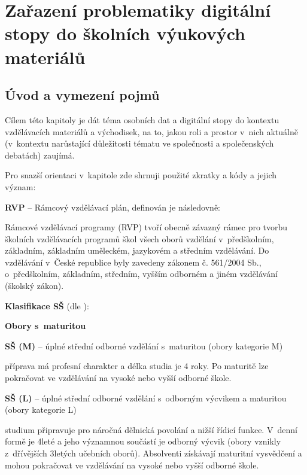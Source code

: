 \chapter{Zařazení problematiky digitální stopy do školních výukových materiálů}

\section{Úvod a vymezení pojmů}

Cílem této kapitoly je dát téma osobních dat a digitální stopy do kontextu vzdělávacích materiálů a východisek, na to, jakou roli a prostor v~nich aktuálně (v~kontextu narůstající důležitosti tématu ve společnosti a společenských debatách) zaujímá. 

Pro snazší orientaci v~kapitole zde shrnuji použité zkratky a kódy a jejich význam:

\textbf{RVP} -- Rámcový vzdělávací plán, definován \citep{rvp} je následovně:

\begin{displayquote}
Rámcové vzdělávací programy (RVP) tvoří obecně závazný rámec pro tvorbu školních vzdělávacích programů škol všech oborů vzdělání v~předškolním, základním, základním uměleckém, jazykovém a středním vzdělávání. Do vzdělávání v~České republice byly zavedeny zákonem č. 561/2004 Sb., o~předškolním, základním, středním, vyšším odborném a jiném vzdělávání (školský zákon).
\end{displayquote}

\textbf{Klasifikace SŠ} (dle \citep{stredni-vzdelavani}):

\textbf{Obory s~maturitou}

\textbf{SŠ (M)} -- úplné střední odborné vzdělání s~maturitou (obory kategorie M)

\begin{displayquote}
příprava má profesní charakter a délka studia je 4 roky. Po maturitě lze pokračovat ve vzdělávání na vysoké nebo vyšší odborné škole.
\end{displayquote}

\textbf{SŠ (L)} -- úplné střední odborné vzdělání s~odborným výcvikem a maturitou (obory kategorie L)

\begin{displayquote}
studium připravuje pro náročná dělnická povolání a nižší řídicí funkce. V~denní formě je 4leté a jeho významnou součástí je odborný výcvik (obory vznikly z~dřívějších 3letých učebních oborů). Absolventi získávají maturitní vysvědčení a mohou pokračovat ve vzdělávání na vysoké nebo vyšší odborné škole.
\end{displayquote}

